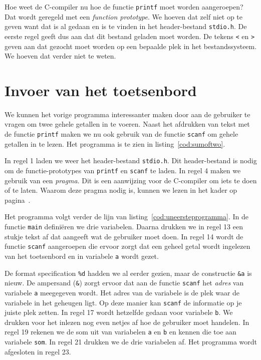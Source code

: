 Hoe weet de C-compiler nu hoe de functie \texttt{printf} moet worden aangeroepen? Dat wordt geregeld met een \textsl{function prototype}. We hoeven dat zelf niet op te geven want dat is al gedaan en is te vinden in het header-bestand \texttt{stdio.h}. De eerste regel geeft dus aan dat dit bestand geladen moet worden. De tekens \texttt{<} en \texttt{>} geven aan dat gezocht moet worden op een bepaalde plek in het bestandssysteem. We hoeven dat verder niet te weten.

\section{Invoer van het toetsenbord}
We kunnen het vorige programma interessanter maken door aan de gebruiker te vragen om twee gehele getallen in te voeren. Naast het afdrukken van tekst met de functie \texttt{printf} maken we nu ook gebruik van de functie \texttt{scanf} om gehele getallen in te lezen. Het programma is te zien in listing~\ref{cod:sumoftwo}.


In regel 1 laden we weer het header-bestand \texttt{stdio.h}. Dit header-bestand is nodig om de functie-prototypes van \texttt{printf} en \texttt{scanf} te laden. In regel 4 maken we gebruik van een \textsl{pragma}. Dit is een aanwijzing voor de C-compiler om iets te doen of te laten. Waarom deze pragma nodig is, kunnen we lezen in het kader op pagina~\pageref{fig:unopmerkingscanf}.

Het programma volgt verder de lijn van listing~\ref{cod:uneersteprogramma}. In de functie \texttt{main} definiëren we drie variabelen. Daarna drukken we in regel 13 een stukje tekst af dat aangeeft wat de gebruiker moet doen. In regel 14 wordt de functie \texttt{scanf} aangeroepen die ervoor zorgt dat een geheel getal wordt ingelezen van het toetsenbord en in variabele \texttt{a} wordt gezet.

De format specification \texttt{\%d} hadden we al eerder gezien, maar de constructie \texttt{\&a} is nieuw. De ampersand (\texttt{\&}) zorgt ervoor dat aan de functie \texttt{scanf} het \textsl{adres} van variabele \texttt{a} meegegeven wordt. Het adres van de variabele is de plek waar de variabele in het geheugen ligt. Op deze manier kan \texttt{scanf} de informatie op je juiste plek zetten. In regel 17 wordt hetzelfde gedaan voor variabele \texttt{b}. We drukken voor het inlezen nog even netjes af hoe de gebruiker moet handelen. In regel 19 rekenen we de som uit van variabelen \texttt{a} en \texttt{b} en kennen die toe aan variabele \texttt{som}. In regel 21 drukken we de drie variabelen af. Het programma wordt afgesloten in regel 23.

